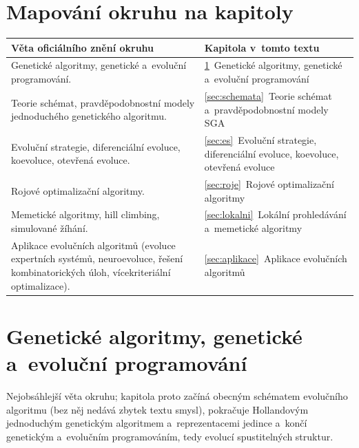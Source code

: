 \documentclass[11pt,a4paper]{article}
\theoremstyle{definition}
\begin{document}
\vspace{2mm}

\section*{Mapování okruhu na kapitoly}

\begin{center}
\small
\begin{tabular}{@{}>{\raggedright\arraybackslash}p{8.6cm}>{\raggedright\arraybackslash}p{7.4cm}@{}}
\toprule
\textbf{Věta oficiálního znění okruhu} & \textbf{Kapitola v~tomto textu} \\
\midrule
Genetické algoritmy, genetické a~evoluční programování.
  & \ref{sec:ga}~Genetické algoritmy, genetické a~evoluční programování \\
Teorie schémat, pravděpodobnostní modely jednoduchého genetického algoritmu.
  & \ref{sec:schemata}~Teorie schémat a~pravděpodobnostní modely SGA \\
Evoluční strategie, diferenciální evoluce, koevoluce, otevřená evoluce.
  & \ref{sec:es}~Evoluční strategie, diferenciální evoluce, koevoluce, otevřená evoluce \\
Rojové optimalizační algoritmy.
  & \ref{sec:roje}~Rojové optimalizační algoritmy \\
Memetické algoritmy, hill climbing, simulované žíhání.
  & \ref{sec:lokalni}~Lokální prohledávání a~memetické algoritmy \\
Aplikace evolučních algoritmů (evoluce expertních systémů, neuroevoluce, řešení
kombinatorických úloh, vícekriteriální optimalizace).
  & \ref{sec:aplikace}~Aplikace evolučních algoritmů \\
\bottomrule
\end{tabular}
\end{center}

\vspace{2mm}
\tableofcontents
\newpage

\section{Genetické algoritmy, genetické a~evoluční programování}
\label{sec:ga}

Nejobsáhlejší věta okruhu; kapitola proto začíná obecným schématem evolučního algoritmu
(bez něj nedává zbytek textu smysl), pokračuje Hollandovým jednoduchým genetickým
algoritmem a~reprezentacemi jedince a~končí genetickým a~evolučním programováním, tedy
evolucí spustitelných struktur.
\end{document}
